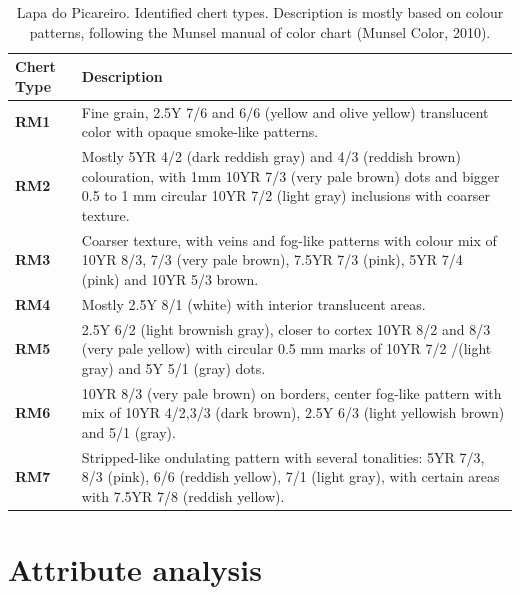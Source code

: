 \documentclass[12pt,twoside]{reedthesis}
\begin{document}
\begin{table}[!h]

\caption{\label{tab:cherttable}Lapa do Picareiro. Identified chert types. Description is mostly based on colour patterns, following the Munsel manual of color chart (Munsel Color, 2010).}
\centering
\fontsize{9}{11}\selectfont
\begin{tabular}[t]{>{\bfseries}l>{\raggedright\arraybackslash}p{10cm}}
\toprule
Chert Type & Description\\
\midrule
RM1 & Fine grain, 2.5Y 7/6 and 6/6 (yellow and olive yellow) translucent color with opaque smoke-like patterns.\\
RM2 & Mostly 5YR 4/2 (dark reddish gray) and 4/3 (reddish brown) colouration, with 1mm 10YR 7/3 (very pale brown) dots and bigger 0.5 to 1 mm circular 10YR 7/2 (light gray) inclusions with coarser texture.\\
RM3 & Coarser texture, with veins and fog-like patterns with colour mix of 10YR 8/3, 7/3 (very pale brown), 7.5YR 7/3 (pink), 5YR 7/4 (pink) and 10YR 5/3 brown.\\
RM4 & Mostly 2.5Y 8/1 (white) with interior translucent areas.\\
RM5 & 2.5Y 6/2 (light brownish gray), closer to cortex 10YR 8/2 and 8/3 (very pale yellow) with circular 0.5 mm marks of 10YR 7/2 /(light gray) and 5Y 5/1 (gray) dots.\\
\addlinespace
RM6 & 10YR 8/3 (very pale brown) on borders, center fog-like pattern with mix of 10YR 4/2,3/3 (dark brown), 2.5Y 6/3 (light yellowish brown) and 5/1 (gray).\\
RM7 & Stripped-like ondulating pattern with several tonalities: 5YR 7/3, 8/3 (pink), 6/6 (reddish yellow), 7/1 (light gray), with certain areas with 7.5YR 7/8 (reddish yellow).\\
\bottomrule
\end{tabular}
\end{table}
\hypertarget{attribute-analysis-1}{%
\chapter{Attribute analysis}\label{attribute-analysis-1}}
\end{document}
